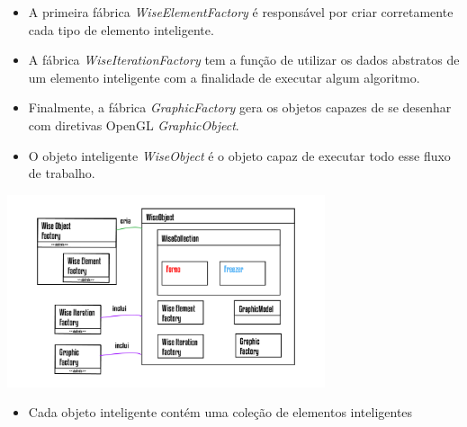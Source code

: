 \documentclass[10pt]{beamer}
\theoremstyle{remark}
\theoremstyle{definition}
\begin{document}
\begin{frame}[allowframebreaks]
\begin{flushright}
		\end{flushright}
		
		\framebreak
	
		\begin{itemize}
				\item A primeira fábrica \textit{WiseElementFactory} é responsável por criar corretamente cada tipo de elemento inteligente.
				\item A fábrica \textit{WiseIterationFactory} tem a função de utilizar os dados abstratos de um elemento inteligente com a finalidade de executar algum algoritmo.
				\item Finalmente, a fábrica \textit{GraphicFactory} gera os objetos capazes de se desenhar com diretivas OpenGL \textit{GraphicObject}.
		\end{itemize}	
		
		\framebreak	
		
		\framebreak
		
		\begin{itemize}
				\item O objeto inteligente \textit{WiseObject} é o objeto capaz de executar todo esse fluxo de trabalho.
		\end{itemize}	
		
		\begin{center}
			
			 \includegraphics[width=0.7\textwidth]{images/WiseObject.png}
			
		\end{center}
		
		\framebreak
	
			\begin{itemize}
				\item 	Cada objeto inteligente contém uma coleção de elementos inteligentes
			\end{itemize}		
		
		\begin{center}
			

\end{center}
\end{frame}
\end{document}

